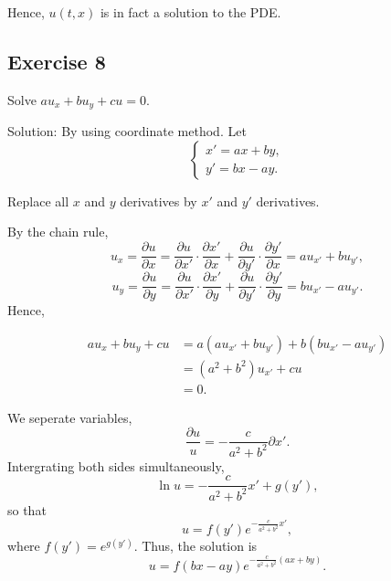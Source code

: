 \documentclass{article}
\begin{document}
			Hence, $u(t,x)$ is in fact a solution to the PDE.


		\subsection{Exercise 8}
		Solve $au_x+bu_y+cu=0.$
		
		Solution:
		By using coordinate method. Let 
		\begin{equation*}
			\begin{cases}
				x'=ax+by,
				\\
				y'=bx-ay.
			\end{cases}
		\end{equation*}

		Replace all $x$ and $y$ derivatives by $x'$ and $y'$ derivatives.

		By the chain rule, \[u_x=\frac{\partial u}{\partial x}=\frac{\partial u}{\partial x'}\cdot\frac{\partial x'}{\partial x}+\frac{\partial u}{\partial y'}\cdot\frac{\partial y'}{\partial x}=au_{x'}+bu_{y'},\]
		\[u_y=\frac{\partial u}{\partial y}=\frac{\partial u}{\partial x'}\cdot\frac{\partial x'}{\partial y}+\frac{\partial u}{\partial y'}\cdot\frac{\partial y'}{\partial y}=bu_{x'}-au_{y'}.\]
		Hence,

		\begin{equation*}
			\begin{aligned}
			au_x+bu_y+cu&=
			a\left(au_{x'}+bu_{y'} \right)+b\left(bu_{x'}-au_{y'}\right)\\
			&=\left(a^2+b^2\right)u_{x'}+cu\\
			&=0.
			\end{aligned}
		\end{equation*}

		We seperate variables, \[\frac{\partial u}{u}=-\frac{c}{a^2+b^2}\partial x'.\]
		Intergrating both sides simultaneously, \[\ln u = -\frac{c}{a^2+b^2}x' +g(y'),\] so that \[ u = f(y')e^{-\frac{c}{a^2+b^2}x'}, \]
		where $f(y')=e^{g(y')}$.
		Thus, the solution is  \[ u = f(bx-ay)e^{-\frac{c}{a^2+b^2}(ax+by)}.\]
\end{document}
